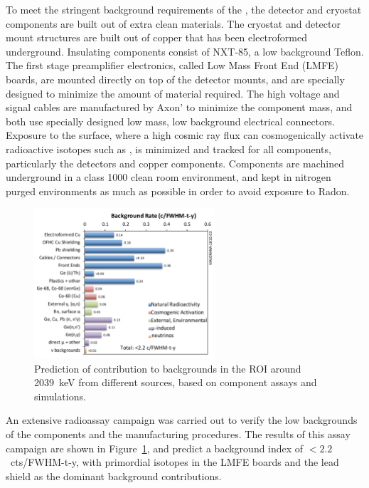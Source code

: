 \documentclass[/main.tex]{subfiles}
\begin{document}
To meet the stringent background requirements of the \MJD, the detector and cryostat components are built out of extra clean materials.
The cryostat and detector mount structures are built out of copper that has been electroformed underground\cite{mjdeforming}.
Insulating components consist of NXT-85, a low background Teflon.
The first stage preamplifier electronics, called Low Mass Front End (LMFE) boards, are mounted directly on top of the detector mounts, and are specially designed to minimize the amount of material required.
The high voltage and signal cables are manufactured by Axon' to minimize the component mass, and both use specially designed low mass, low background electrical connectors\cite{mjdHV, mjdsig}.
Exposure to the surface, where a high cosmic ray flux can cosmogenically activate radioactive isotopes such as , is minimized and tracked for all components, particularly the detectors and copper components\cite{mjdptdb}.
Components are machined underground in a class 1000 clean room environment, and kept in nitrogen purged environments as much as possible in order to avoid exposure to Radon.
\begin{figure}
  \centering
  \includegraphics[width=0.6\textwidth]{bgassay}
  \caption[Background predictions based on component assays]{\label{fig:assay}
    Prediction of contribution to backgrounds in the ROI around 2039~keV from different sources, based on component assays and simulations.
  }
\end{figure}
An extensive radioassay campaign was carried out to verify the low backgrounds of the components and the manufacturing procedures\cite{mjdassay}.
The results of this assay campaign are shown in Figure~\ref{fig:assay}, and predict a background index of $<2.2$~cts/FWHM-t-y, with primordial isotopes in the LMFE boards and the lead shield as the dominant background contributions.
\end{document}
